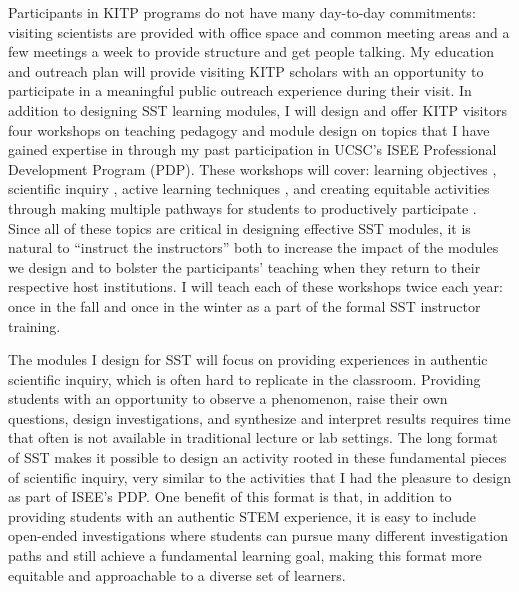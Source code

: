 \documentclass[11pt]{amsart} %
\theoremstyle{definition}
\numberwithin{equation}{section}
\begin{document}
Participants in KITP programs do not have many day-to-day commitments: visiting scientists are provided with office space and common meeting areas and a few meetings a week to provide structure and get people talking.
My education and outreach plan will provide  visiting KITP scholars with an opportunity to participate in a meaningful public outreach experience during their visit.
In addition to designing SST learning modules, I will design and offer KITP visitors four workshops on teaching pedagogy and module design on topics that I have gained expertise in through my past participation in UCSC's ISEE Professional Development Program (PDP).
These workshops will cover: learning objectives \citep{simon_taylor_2008}, scientific inquiry \citep{inquiry}, active learning techniques \citep{freeman_etal_2014}, and creating equitable activities through making multiple pathways for students to productively participate \citep{isee_edi}.
Since all of these topics are critical in designing effective SST modules, it is natural to ``instruct the instructors'' both to increase the impact of the modules we design and to bolster the participants' teaching when they return to their respective host institutions.
I will teach each of these workshops twice each year: once in the fall and once in the winter as a part of the formal SST instructor training.

The modules I design for SST will focus on providing experiences in authentic scientific inquiry, which is often hard to replicate in the classroom.
Providing students with an opportunity to observe a phenomenon, raise their own questions, design investigations, and synthesize and interpret results requires time that often is not available in traditional lecture or lab settings.
The long format of SST makes it possible to design an activity rooted in these fundamental pieces of scientific inquiry, very similar to the activities that I had the pleasure to design as part of ISEE's PDP.
One benefit of this format is that, in addition to providing students with an authentic STEM experience, it is easy to include open-ended investigations where students can pursue many different investigation paths and still achieve a fundamental learning goal, making this format more equitable and approachable to a diverse set of learners.
\end{document}
